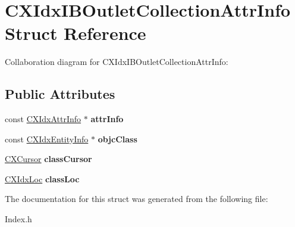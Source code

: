 \hypertarget{structCXIdxIBOutletCollectionAttrInfo}{}\section{C\+X\+Idx\+I\+B\+Outlet\+Collection\+Attr\+Info Struct Reference}
\label{structCXIdxIBOutletCollectionAttrInfo}


Collaboration diagram for C\+X\+Idx\+I\+B\+Outlet\+Collection\+Attr\+Info\+:
\subsection*{Public Attributes}
\begin{DoxyCompactItemize}
\item 
\mbox{\label{structCXIdxIBOutletCollectionAttrInfo_a03b81a7206b7339593b59e9b5044c6cf}} 
const \hyperlink{structCXIdxAttrInfo}{C\+X\+Idx\+Attr\+Info} $\ast$ {\bfseries attr\+Info}
\item 
\mbox{\label{structCXIdxIBOutletCollectionAttrInfo_a3af28f98bf03069265b829cd061b8cd4}} 
const \hyperlink{structCXIdxEntityInfo}{C\+X\+Idx\+Entity\+Info} $\ast$ {\bfseries objc\+Class}
\item 
\mbox{\label{structCXIdxIBOutletCollectionAttrInfo_a36ed5b7b2b3eb286d8028df4b62ceba8}} 
\hyperlink{structCXCursor}{C\+X\+Cursor} {\bfseries class\+Cursor}
\item 
\mbox{\label{structCXIdxIBOutletCollectionAttrInfo_add423b2700a97c915a1b316c4e674005}} 
\hyperlink{structCXIdxLoc}{C\+X\+Idx\+Loc} {\bfseries class\+Loc}
\end{DoxyCompactItemize}


The documentation for this struct was generated from the following file\+:\begin{DoxyCompactItemize}
\item 
Index.\+h\end{DoxyCompactItemize}
